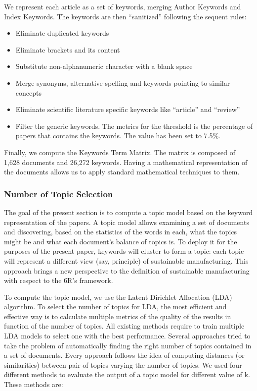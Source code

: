 \documentclass[]{book}
\providecommand{\tightlist}{%
  \setlength{\itemsep}{0pt}\setlength{\parskip}{0pt}}
\begin{document}
We represent each article as a set of keywords, merging Author Keywords
and Index Keywords. The keywords are then ``sanitized'' following the
sequent rules:

\begin{itemize}
\tightlist
\item
  Eliminate duplicated keywords
\item
  Eliminate brackets and its content
\item
  Substitute non-alphanumeric character with a blank space
\item
  Merge synonyms, alternative spelling and keywords pointing to similar
  concepts
\item
  Eliminate scientific literature specific keywords like ``article'' and
  ``review''
\item
  Filter the generic keywords. The metrics for the threshold is the
  percentage of papers that contains the keywords. The value has been
  set to 7.5\%.
\end{itemize}

Finally, we compute the Keywords Term Matrix. The matrix is composed of
1,628 documents and 26,272 keywords. Having a mathematical
representation of the documents allows us to apply standard mathematical
techniques to them.

\subsubsection*{Number of Topic
Selection}\label{number-of-topic-selection}

The goal of the present section is to compute a topic model based on the
keyword representation of the papers. A topic model allows examining a
set of documents and discovering, based on the statistics of the words
in each, what the topics might be and what each document's balance of
topics is. To deploy it for the purposes of the present paper, keywords
will cluster to form a topic: each topic will represent a different view
(say, principle) of sustainable manufacturing. This approach brings a
new perspective to the definition of sustainable manufacturing with
respect to the 6R's framework.

To compute the topic model, we use the Latent Dirichlet Allocation (LDA)
algorithm. To select the number of topics for LDA, the most efficient
and effective way is to calculate multiple metrics of the quality of the
results in function of the number of topics. All existing methods
require to train multiple LDA models to select one with the best
performance. Several approaches tried to take the problem of
automatically finding the right number of topics contained in a set of
documents. Every approach follows the idea of computing distances (or
similarities) between pair of topics varying the number of topics. We
used four different methods to evaluate the output of a topic model for
different value of k. These methods are:
\end{document}
